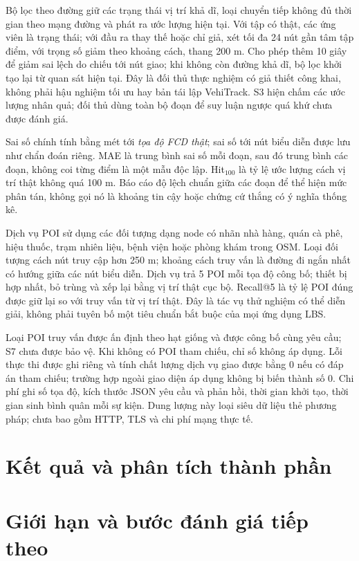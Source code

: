 Bộ lọc theo đường giữ các trạng thái vị trí khả dĩ, loại chuyển tiếp không đủ thời gian theo mạng đường và phát ra ước lượng hiện tại. Với tập có thật, các ứng viên là trạng thái; với đầu ra thay thế hoặc chỉ giả, xét tối đa 24 nút gần tâm tập điểm, với trọng số giảm theo khoảng cách, thang 200 m. Cho phép thêm 10 giây để giảm sai lệch do chiếu tới nút giao; khi không còn đường khả dĩ, bộ lọc khởi tạo lại từ quan sát hiện tại. Đây là đối thủ thực nghiệm có giả thiết công khai, không phải hậu nghiệm tối ưu hay bản tái lập VehiTrack. S3 hiện chấm các ước lượng nhân quả; đối thủ dùng toàn bộ đoạn để suy luận ngược quá khứ chưa được đánh giá.

Sai số chính tính bằng mét tới \emph{tọa độ FCD thật}; sai số tới nút biểu diễn được lưu như chẩn đoán riêng. MAE là trung bình sai số mỗi đoạn, sau đó trung bình các đoạn, không coi từng điểm là một mẫu độc lập. Hit$_{100}$ là tỷ lệ ước lượng cách vị trí thật không quá 100 m. Báo cáo độ lệch chuẩn giữa các đoạn để thể hiện mức phân tán, không gọi nó là khoảng tin cậy hoặc chứng cứ thắng có ý nghĩa thống kê.

Dịch vụ POI sử dụng các đối tượng dạng node có nhãn nhà hàng, quán cà phê, hiệu thuốc, trạm nhiên liệu, bệnh viện hoặc phòng khám trong OSM. Loại đối tượng cách nút truy cập hơn 250 m; khoảng cách truy vấn là đường đi ngắn nhất có hướng giữa các nút biểu diễn. Dịch vụ trả 5 POI mỗi tọa độ công bố; thiết bị hợp nhất, bỏ trùng và xếp lại bằng vị trí thật cục bộ. Recall@5 là tỷ lệ POI đúng được giữ lại so với truy vấn từ vị trí thật. Đây là tác vụ thử nghiệm có thể diễn giải, không phải tuyên bố một tiêu chuẩn bắt buộc của mọi ứng dụng LBS.

Loại POI truy vấn được ấn định theo hạt giống và được công bố cùng yêu cầu; S7 chưa được bảo vệ. Khi không có POI tham chiếu, chỉ số không áp dụng. Lỗi thực thi được ghi riêng và tính chất lượng dịch vụ giao được bằng 0 nếu có đáp án tham chiếu; trường hợp ngoài giao diện áp dụng không bị biến thành số 0. Chi phí ghi số tọa độ, kích thước JSON yêu cầu và phản hồi, thời gian khởi tạo, thời gian sinh bình quân mỗi sự kiện. Dung lượng này loại siêu dữ liệu thẻ phương pháp; chưa bao gồm HTTP, TLS và chi phí mạng thực tế.

\section{Kết quả và phân tích thành phần}


\section{Giới hạn và bước đánh giá tiếp theo}


